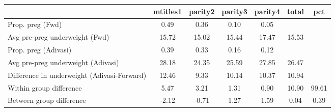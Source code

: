 \begin{tabular}{l*{6}{c}}
\toprule
            &\multicolumn{1}{c}{mtitles1}&\multicolumn{1}{c}{parity2}&\multicolumn{1}{c}{parity3}&\multicolumn{1}{c}{parity4}&\multicolumn{1}{c}{total}&\multicolumn{1}{c}{pct}\\
\midrule
\midrule
Prop. preg (Fwd)&        0.49&        0.36&        0.10&        0.05&            &            \\
Avg pre-preg underweight (Fwd)&       15.72&       15.02&       15.44&       17.47&       15.53&            \\
Prop. preg (Adivasi)&        0.39&        0.33&        0.16&        0.12&            &            \\
Avg pre-preg underweight (Adivasi)&       28.18&       24.35&       25.59&       27.85&       26.47&            \\
Difference in underweight (Adivasi-Forward)&       12.46&        9.33&       10.14&       10.37&       10.94&            \\
Within group difference&        5.47&        3.21&        1.31&        0.90&       10.90&       99.61\\
Between group difference&       -2.12&       -0.71&        1.27&        1.59&        0.04&        0.39\\
\bottomrule
\end{tabular}
